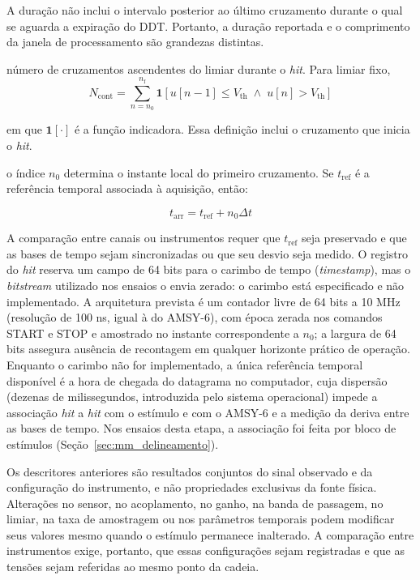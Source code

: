 \begin{description}
	A duração não inclui o intervalo posterior ao último cruzamento durante o qual se aguarda a expiração do DDT. Portanto, a duração reportada e o comprimento da janela de processamento são grandezas distintas.
	
	\item[Contagens:] número de cruzamentos ascendentes do limiar durante o \textit{hit}. Para limiar fixo,
	\begin{equation}
		N_{\mathrm{cont}} = \sum_{n=n_0}^{n_{\mathrm{f}}} \mathbf{1} \left[u[n-1]\leq V_{\mathrm{th}} \;\wedge\; u[n]>V_{\mathrm{th}} \right]
		\label{v2:eq:contagens_hit}
	\end{equation}
	
	\noindent
	em que \(\mathbf{1}[\cdot]\) é a função indicadora. Essa definição inclui o cruzamento que inicia o \textit{hit}.
	
	\item[Instante de chegada:] o índice \(n_0\) determina o instante local do primeiro cruzamento. Se \(t_{\mathrm{ref}}\) é a referência temporal associada à aquisição, então:
	
	\begin{equation}
		t_{\mathrm{arr}} = t_{\mathrm{ref}} + n_0\Delta t
		\label{v2:eq:instante_chegada}
	\end{equation}
	
	A comparação entre canais ou instrumentos requer que \(t_{\mathrm{ref}}\) seja preservado e que as bases de tempo sejam sincronizadas ou que seu desvio seja medido. O registro do \textit{hit} reserva um campo de 64 bits para o carimbo de tempo (\textit{timestamp}), mas o \textit{bitstream} utilizado nos ensaios o envia zerado: o carimbo está especificado e não implementado. A arquitetura prevista é um contador livre de 64 bits a 10 MHz (resolução de 100 ns, igual à do AMSY-6), com época zerada nos comandos START e STOP e amostrado no instante correspondente a \(n_0\); a largura de 64 bits assegura ausência de recontagem em qualquer horizonte prático de operação. Enquanto o carimbo não for implementado, a única referência temporal disponível é a hora de chegada do datagrama no computador, cuja dispersão (dezenas de milissegundos, introduzida pelo sistema operacional) impede a associação \textit{hit} a \textit{hit} com o estímulo e com o AMSY-6 e a medição da deriva entre as bases de tempo. Nos ensaios desta etapa, a associação foi feita por bloco de estímulos (Seção~\ref{sec:mm_delineamento}).
\end{description}

Os descritores anteriores são resultados conjuntos do sinal observado e da configuração do instrumento, e não propriedades exclusivas da fonte física. Alterações no sensor, no acoplamento, no ganho, na banda de passagem, no limiar, na taxa de amostragem ou nos parâmetros temporais podem modificar seus valores mesmo quando o estímulo permanece inalterado. A comparação entre instrumentos exige, portanto, que essas configurações sejam registradas e que as tensões sejam referidas ao mesmo ponto da cadeia.

